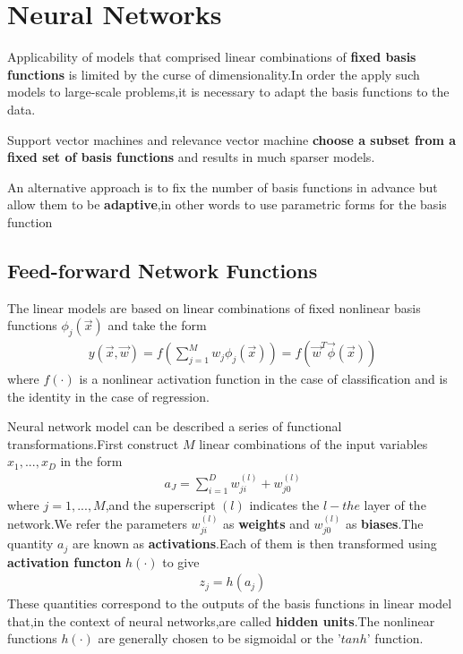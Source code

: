 \chapter{Neural Networks}
\label{chapter:neural networks}

Applicability of models that comprised linear combinations of \textbf{fixed basis functions} is limited by the curse of dimensionality.In order the apply such models to large-scale problems,it is necessary to adapt the basis functions to the data.

Support vector machines and relevance vector machine \textbf{choose a subset from a fixed set of basis functions} and results in much sparser models.

An alternative approach is to fix the number of basis functions in advance but allow them to be \textbf{adaptive},in other words to use parametric forms for the basis function 
\section{Feed-forward Network Functions}
The linear models are based on linear combinations of fixed nonlinear basis functions $\phi_j(\vec{x})$ and take the form
\begin{align}
y(\vec{x},\vec{w}) = f(\sum_{j=1}^{M}w_j\phi_j(\vec{x})) = f(\vec{w}^T\vec{\phi}(\vec{x}))
\end{align}
where $f(\cdot)$ is a nonlinear activation function in the case of classification and is the identity in the case of regression.

Neural network model can be described a series of functional transformations.First construct $M$ linear combinations of the input variables $x_1,...,x_D$ in the form
\begin{align}
a_J = \sum_{i=1}^{D}w_{ji}^{(l)}+w_{j0}^{(l)}
\end{align}
where $j=1,...,M$,and the superscript $(l)$ indicates the $l-the$ layer of the network.We refer the parameters $w_{ji}^{(l)}$ as \textbf{weights} and $w_{j0}^{(l)}$ as \textbf{biases}.The quantity $a_j$ are known as \textbf{activations}.Each of them is then transformed using \textbf{activation functon} $h(\cdot)$ to give
\begin{align}
z_j=h(a_j)
\end{align}
These quantities correspond to the outputs of the basis functions in linear model that,in the context of neural networks,are called \textbf{hidden units}.The nonlinear functions $h(\cdot)$ are generally chosen to be sigmoidal or the '$tanh$' function.

